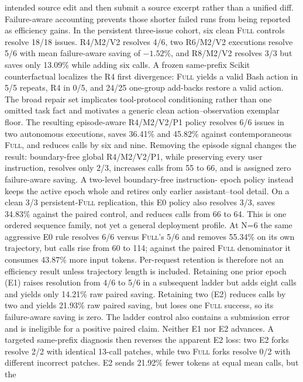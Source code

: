 \documentclass[11pt]{article}
\begin{document}
intended source edit and then submit a source excerpt rather than a unified
diff. Failure-aware accounting prevents those shorter failed runs from being
reported as efficiency gains.
In the persistent three-issue cohort, six clean \textsc{Full} controls resolve
18/18 issues. R4/M2/V2 resolves 4/6, two R6/M2/V2 executions resolve 5/6 with
mean failure-aware saving of $-1.52$\%, and R8/M2/V2 resolves 3/3 but saves only
13.09\% while adding six calls. A frozen same-prefix Scikit counterfactual localizes the
R4 first divergence: \textsc{Full} yields a valid Bash action in 5/5 repeats,
R4 in 0/5, and 24/25 one-group add-backs restore a valid action. The broad
repair set implicates tool-protocol conditioning rather than one omitted task
fact and motivates a generic clean action--observation exemplar floor. The
resulting episode-aware R4/M2/V2/P1 policy resolves 6/6 issues in two
autonomous executions, saves 36.41\% and 45.82\% against contemporaneous
\textsc{Full}, and reduces calls by six and nine.  Removing the episode signal
changes the result: boundary-free global R4/M2/V2/P1, while preserving every
user instruction, resolves only 2/3, increases calls from 55 to 66, and is
assigned zero failure-aware saving.  A two-level boundary-free instruction-
epoch policy instead keeps the active epoch whole and retires only earlier
assistant--tool detail.  On a clean 3/3 persistent-\textsc{Full} replication,
this E0 policy also resolves 3/3, saves 34.83\% against the paired control, and
reduces calls from 66 to 64.  This is one ordered sequence family, not yet a
general deployment profile.  At N=6 the same aggressive E0 rule resolves 6/6
versus \textsc{Full}'s 5/6 and removes 55.34\% on its own trajectory, but calls
rise from 60 to 114; against the paired \textsc{Full} denominator it consumes
43.87\% more input tokens.  Per-request retention is therefore not an
efficiency result unless trajectory length is included.  Retaining one prior
epoch (E1) raises resolution from 4/6 to 5/6 in a subsequent ladder but adds
eight calls and yields only 14.21\% raw paired saving.  Retaining two (E2)
reduces calls by two and yields 21.93\% raw paired saving, but loses one
\textsc{Full} success, so its failure-aware saving is zero.  The ladder control
also contains a submission error and is ineligible for a positive paired
claim.  Neither E1 nor E2 advances.  A targeted same-prefix diagnosis then
reverses the apparent E2 loss: two E2 forks resolve 2/2 with identical
13-call patches, while two \textsc{Full} forks resolve 0/2 with different
incorrect patches.  E2 sends 21.92\% fewer tokens at equal mean calls, but the
\end{document}
